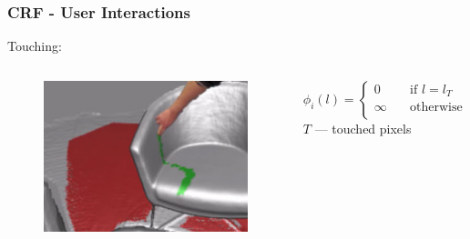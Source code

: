 \documentclass[mathserif, 10pt]{beamer}
\begin{document}
\begin{frame}
\frametitle{CRF - User Interactions}

  Touching:
  \begin{columns}
   \begin{column}{0.25\textwidth}
    \begin{figure}
    \includegraphics[width=\textwidth]{figures/touch}
    \end{figure}
    \end{column}
    \begin{column}{0.75\textwidth}
      \begin{equation}
	\phi_i(l) =
	  \begin{cases}
	    0      & \quad \text{if } l = l_T\\
	    \infty  & \quad \text{otherwise}\\
	  \end{cases}
      \end{equation}
      \center
      $T$ --- touched pixels
   \end{column}

  \end{columns}
  

\end{frame}
\end{document}
